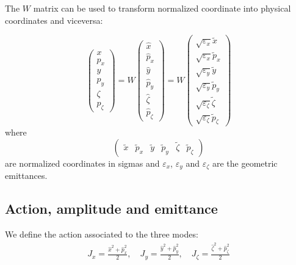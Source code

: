 The $W$ matrix can be used to transform normalized coordinate into physical coordinates and viceversa:

\begin{equation}
\left(\begin{array}{l}
x \\
p_x \\
y \\
p_y \\
\zeta \\
p_\zeta
\end{array}\right)
=
W
\left(\begin{array}{l}
\hat{x} \\
\hat{p}_x \\
\hat{y} \\
\hat{p}_y \\
\hat{\zeta} \\
\hat{p}_\zeta
\end{array}\right)
=
W
\left(\begin{array}{l}
\sqrt{\varepsilon_x} \tilde{x} \\
\sqrt{\varepsilon_x} \tilde{p}_x \\
\sqrt{\varepsilon_y} \tilde{y} \\
\sqrt{\varepsilon_y} \tilde{p}_y \\
\sqrt{\varepsilon_\zeta} \tilde{\zeta} \\
\sqrt{\varepsilon_\zeta} \tilde{p}_\zeta
\end{array}\right)
\label{eq:norm_coord}
\end{equation}
where 
\begin{equation}
\left(\begin{array}{llllll}\tilde{x} & \tilde{p}_x & \tilde{y} & \tilde{p}_y & \tilde{\zeta} & \tilde{p}_\zeta\end{array}\right)
\end{equation}
are normalized coordinates in sigmas and $\varepsilon_x$, $\varepsilon_y$ and $\varepsilon_\zeta$ are the geometric emittances.

\subsection{Action, amplitude and emittance}

We define the action associated to the three modes:
\begin{align}
J_x = \frac{\hat{x}^2 + \hat{p}^2_x}{2},
\quad
J_y = \frac{\hat{y}^2 + \hat{p}^2_y}{2},
\quad
J_\zeta = \frac{\hat{\zeta}^2 + \hat{p}^2_\zeta}{2}
\label{eq:action}
\end{align}

